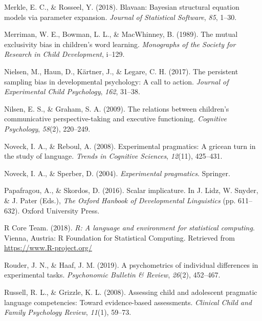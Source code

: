 \documentclass[
  man,floatsintext]{apa6}
\newlength{\cslhangindent}
\newlength{\cslentryspacingunit} %
\newenvironment{CSLReferences}[2] %
 {%
  \setlength{\parindent}{0pt}
  \ifodd #1
  \let\oldpar\par
  \def\par{\hangindent=\cslhangindent\oldpar}
  \fi
  \setlength{\parskip}{#2\cslentryspacingunit}
 }%
 {}
\begin{document}
\begin{CSLReferences}{1}{0}
\leavevmode{}%
Merkle, E. C., \& Rosseel, Y. (2018). Blavaan: Bayesian structural equation models via parameter expansion. \emph{Journal of Statistical Software}, \emph{85}, 1--30.

\leavevmode{}%
Merriman, W. E., Bowman, L. L., \& MacWhinney, B. (1989). The mutual exclusivity bias in children's word learning. \emph{Monographs of the Society for Research in Child Development}, i--129.

\leavevmode{}%
Nielsen, M., Haun, D., Kärtner, J., \& Legare, C. H. (2017). The persistent sampling bias in developmental psychology: A call to action. \emph{Journal of Experimental Child Psychology}, \emph{162}, 31--38.

\leavevmode{}%
Nilsen, E. S., \& Graham, S. A. (2009). The relations between children's communicative perspective-taking and executive functioning. \emph{Cognitive Psychology}, \emph{58}(2), 220--249.

\leavevmode{}%
Noveck, I. A., \& Reboul, A. (2008). Experimental pragmatics: A gricean turn in the study of language. \emph{Trends in Cognitive Sciences}, \emph{12}(11), 425--431.

\leavevmode{}%
Noveck, I. A., \& Sperber, D. (2004). \emph{Experimental pragmatics}. Springer.

\leavevmode{}%
Papafragou, A., \& Skordos, D. (2016). Scalar implicature. In J. Lidz, W. Snyder, \& J. Pater (Eds.), \emph{The Oxford Hanbook of Developmental Linguistics} (pp. 611--632). Oxford University Press.

\leavevmode{}%
R Core Team. (2018). \emph{R: A language and environment for statistical computing}. Vienna, Austria: R Foundation for Statistical Computing. Retrieved from \url{https://www.R-project.org/}

\leavevmode{}%
Rouder, J. N., \& Haaf, J. M. (2019). A psychometrics of individual differences in experimental tasks. \emph{Psychonomic Bulletin \& Review}, \emph{26}(2), 452--467.

\leavevmode{}%
Russell, R. L., \& Grizzle, K. L. (2008). Assessing child and adolescent pragmatic language competencies: Toward evidence-based assessments. \emph{Clinical Child and Family Psychology Review}, \emph{11}(1), 59--73.


\end{CSLReferences}
\end{document}
